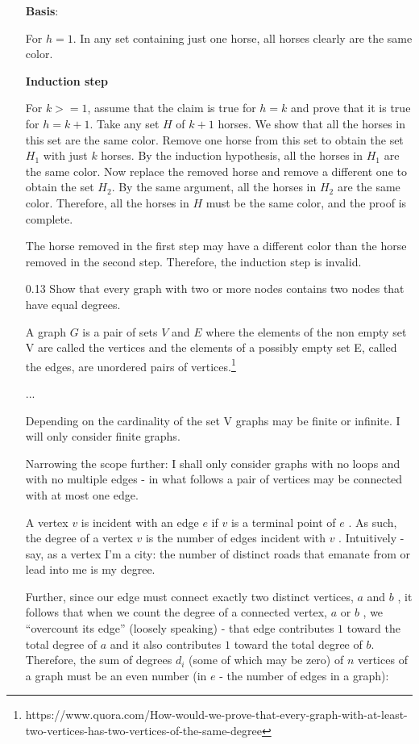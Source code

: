 \begin{enumerate}
\textbf{Basis}: 

For $h = 1$. In any set containing just one horse, all horses clearly are the same color.

\textbf{Induction step}

For $k >= 1$, assume that the claim is true for $h = k$ and prove that it is true for $h = k+1$. Take any set $H$ of $k+1$ horses. We show that all the horses in this set are the same color. Remove one horse from this set to obtain the set $H_1$ with just $k$ horses. By the induction hypothesis, all the horses in $H_1$ are the same color. Now replace the removed horse and remove a different one to obtain the set $H_2$. By the same argument, all the horses in $H_2$ are the same color. Therefore, all the horses in $H$ must be the same color, and the proof is complete.

The horse removed in the first step may have a different color than the horse removed in the second step. Therefore, the induction step is invalid.

\item[0.13]
Show that every graph with two or more nodes contains two nodes that have equal degrees.

A graph $G$ is a pair of sets $V$ and $E$ where the elements of the non empty set V are called the vertices and the elements of a possibly empty set E, called the edges, are unordered pairs of vertices.\footnote{https://www.quora.com/How-would-we-prove-that-every-graph-with-at-least-two-vertices-has-two-vertices-of-the-same-degree}

...

Depending on the cardinality of the set V graphs may be finite or infinite. I will only consider finite graphs.

Narrowing the scope further: I shall only consider graphs with no loops and with no multiple edges - in what follows a pair of vertices may be connected with at most one edge.

A vertex 
$v$
 is incident with an edge 
$e$
 if 
$v$
 is a terminal point of 
$e$
. As such, the degree of a vertex 
$v$
 is the number of edges incident with 
$v$
. Intuitively - say, as a vertex I’m a city: the number of distinct roads that emanate from or lead into me is my degree.

Further, since our edge must connect exactly two distinct vertices, 
$a$
 and 
$b$
, it follows that when we count the degree of a connected vertex, 
$a$
 or 
$b$
, we “overcount its edge” (loosely speaking) - that edge contributes 
$1$
 toward the total degree of $a$ and it also contributes $1$ toward the total degree of $b$.
Therefore, the sum of degrees $d_{i}$ (some of which may be zero) of $n$ vertices of a graph must be an even number (in $e$ - the number of edges in a graph):


\end{enumerate}
